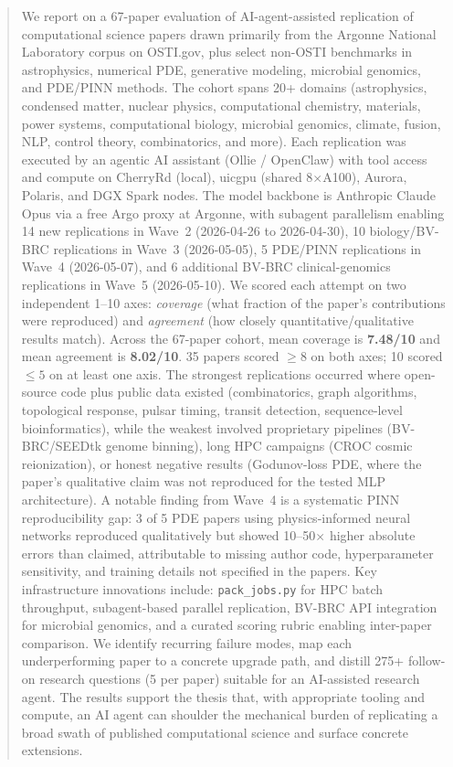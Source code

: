 \begin{abstract}
\noindent We report on a 67-paper evaluation of AI-agent-assisted replication of
computational science papers drawn primarily from the Argonne National Laboratory
corpus on OSTI.gov, plus select non-OSTI benchmarks in astrophysics,
numerical PDE, generative modeling, microbial genomics, and PDE/PINN methods. The cohort spans 20+ domains
(astrophysics, condensed matter, nuclear physics, computational chemistry,
materials, power systems, computational biology, microbial genomics, climate, fusion, NLP,
control theory, combinatorics, and more). Each replication was executed by an
agentic AI assistant (Ollie / OpenClaw) with tool access and compute on
CherryRd (local), uicgpu (shared 8$\times$A100), Aurora, Polaris, and DGX Spark
nodes. The model backbone is Anthropic Claude Opus via a free Argo proxy at
Argonne, with subagent parallelism enabling 14 new replications in Wave~2
(2026-04-26 to 2026-04-30), 10 biology/BV-BRC replications in Wave~3
(2026-05-05), 5 PDE/PINN replications in Wave~4 (2026-05-07), and 6 additional BV-BRC clinical-genomics replications in Wave~5 (2026-05-10). We scored each attempt on two independent 1--10 axes:
\emph{coverage} (what fraction of the paper's contributions were reproduced)
and \emph{agreement} (how closely quantitative/qualitative results match).
Across the 67-paper cohort, mean coverage is \textbf{7.48/10} and mean
agreement is \textbf{8.02/10}. 35 papers scored $\geq 8$ on both axes; 10
scored $\leq 5$ on at least one axis. The strongest replications occurred
where open-source code plus public data existed (combinatorics, graph
algorithms, topological response, pulsar timing, transit detection,
sequence-level bioinformatics), while the
weakest involved proprietary pipelines (BV-BRC/SEEDtk genome binning), long HPC
campaigns (CROC cosmic reionization), or honest negative results
(Godunov-loss PDE, where the paper's qualitative claim was not reproduced for
the tested MLP architecture). A notable finding from Wave~4 is a systematic
PINN reproducibility gap: 3 of 5 PDE papers using physics-informed neural
networks reproduced qualitatively but showed 10--50$\times$ higher absolute
errors than claimed, attributable to missing author code, hyperparameter
sensitivity, and training details not specified in the papers.
Key infrastructure innovations include:
\texttt{pack\_jobs.py} for HPC batch throughput, subagent-based parallel
replication, BV-BRC API integration for microbial genomics, and a curated
scoring rubric enabling inter-paper comparison.
We identify recurring failure modes, map each underperforming paper to a
concrete upgrade path, and distill 275+ follow-on research questions (5 per
paper) suitable for an AI-assisted research agent. The results support the
thesis that, with appropriate tooling and compute, an AI agent can shoulder
the mechanical burden of replicating a broad swath of published computational
science and surface concrete extensions.
\end{abstract}
